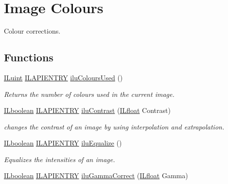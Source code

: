 \hypertarget{group__ilu__colour}{\section{Image Colours}
\label{group__ilu__colour}
}


Colour corrections.  


\subsection*{Functions}
\begin{DoxyCompactItemize}
\item 
\hyperlink{group__il__types_gaff8e86a1072c8d7cfe387fb87c6ed8e1}{I\+Luint} \hyperlink{_i_l_8h_a69c08a8d06df986f7e46f209d131ef2f}{I\+L\+A\+P\+I\+E\+N\+T\+R\+Y} \hyperlink{group__ilu__colour_ga1c019783a7ab60a1b9fee1ed5b2aadbe}{ilu\+Colours\+Used} ()
\begin{DoxyCompactList}\small\item\em Returns the number of colours used in the current image. \end{DoxyCompactList}\item 
\hyperlink{group__il__types_gaa6aa7c95cfdc06b4d8601ef832b7bb0a}{I\+Lboolean} \hyperlink{_i_l_8h_a69c08a8d06df986f7e46f209d131ef2f}{I\+L\+A\+P\+I\+E\+N\+T\+R\+Y} \hyperlink{group__ilu__colour_ga674c6a79168815f579338c30e94cd086}{ilu\+Contrast} (\hyperlink{group__il__types_ga376156c9461893f4b1a5de9579dc86f2}{I\+Lfloat} Contrast)
\begin{DoxyCompactList}\small\item\em changes the contrast of an image by using interpolation and extrapolation. \end{DoxyCompactList}\item 
\hyperlink{group__il__types_gaa6aa7c95cfdc06b4d8601ef832b7bb0a}{I\+Lboolean} \hyperlink{_i_l_8h_a69c08a8d06df986f7e46f209d131ef2f}{I\+L\+A\+P\+I\+E\+N\+T\+R\+Y} \hyperlink{group__ilu__colour_ga5543086bca10106a064d3dce59770312}{ilu\+Equalize} ()
\begin{DoxyCompactList}\small\item\em Equalizes the intensities of an image. \end{DoxyCompactList}\item 
\hyperlink{group__il__types_gaa6aa7c95cfdc06b4d8601ef832b7bb0a}{I\+Lboolean} \hyperlink{_i_l_8h_a69c08a8d06df986f7e46f209d131ef2f}{I\+L\+A\+P\+I\+E\+N\+T\+R\+Y} \hyperlink{group__ilu__colour_ga06739004ee4930a65ebf57354060095a}{ilu\+Gamma\+Correct} (\hyperlink{group__il__types_ga376156c9461893f4b1a5de9579dc86f2}{I\+Lfloat} Gamma)

\end{DoxyCompactItemize}
